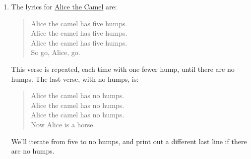 \documentclass[]{book}
\theoremstyle{plain}
\theoremstyle{remark}
\theoremstyle{definition}
\theoremstyle{definition}
\theoremstyle{definition}
\theoremstyle{remark}
\begin{document}
\begin{enumerate}
\def\labelenumi{\arabic{enumi}.}
\item
  The lyrics for \href{http://www.kididdles.com/lyrics/a012.html}{Alice
  the Camel} are:

  \begin{quote}
  Alice the camel has five humps.\\
  Alice the camel has five humps.\\
  Alice the camel has five humps.\\
  So go, Alice, go.
  \end{quote}

  This verse is repeated, each time with one fewer hump, until there are
  no humps. The last verse, with no humps, is:

  \begin{quote}
  Alice the camel has no humps.\\
  Alice the camel has no humps.\\
  Alice the camel has no humps.\\
  Now Alice is a horse.
  \end{quote}

  We'll iterate from five to no humps, and print out a different last
  line if there are no humps.


\end{enumerate}
\end{document}
